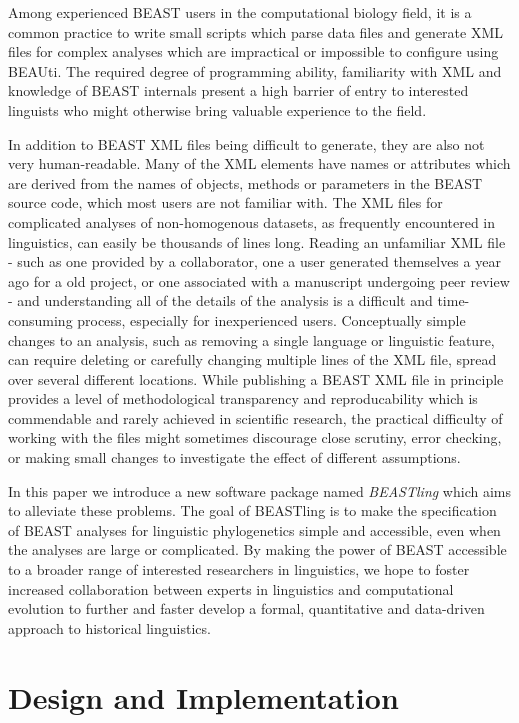 \documentclass[twocolumn,10pt]{scrartcl}
\begin{document}
Among experienced BEAST users in the computational biology field, it is a common practice to write small scripts which parse data files and generate XML files for complex analyses which are impractical or impossible to configure using BEAUti.  The required degree of programming ability, familiarity with XML and knowledge of BEAST internals present a high barrier of entry to interested linguists who might otherwise bring valuable experience to the field.

In addition to BEAST XML files being difficult to generate, they are also not very human-readable.  Many of the XML elements have names or attributes which are derived from the names of objects, methods or parameters in the BEAST source code, which most users are not familiar with.  The XML files for complicated analyses of non-homogenous datasets, as frequently encountered in linguistics, can easily be thousands of lines long.  Reading an unfamiliar XML file - such as one provided by a collaborator, one a user generated themselves a year ago for a old project, or one associated with a manuscript undergoing peer review - and understanding all of the details of the analysis is a difficult and time-consuming process, especially for inexperienced users.  Conceptually simple changes to an analysis, such as removing a single language or linguistic feature, can require deleting or carefully changing multiple lines of the XML file, spread over several different locations.  While publishing a BEAST XML file in principle provides a level of methodological transparency and reproducability which is commendable and rarely achieved in scientific research, the practical difficulty of working with the files might sometimes discourage close scrutiny, error checking, or making small changes to investigate the effect of different assumptions.

In this paper we introduce a new software package named \emph{BEASTling} which aims to alleviate these problems.  The goal of BEASTling is to make the specification of BEAST analyses for linguistic phylogenetics simple and accessible, even when the analyses are large or complicated.  By making the power of BEAST accessible to a broader range of interested researchers in linguistics, we hope to foster increased collaboration between experts in linguistics and computational evolution to further and faster develop a formal, quantitative and data-driven approach to historical linguistics.

\section{Design and Implementation}
\end{document}
